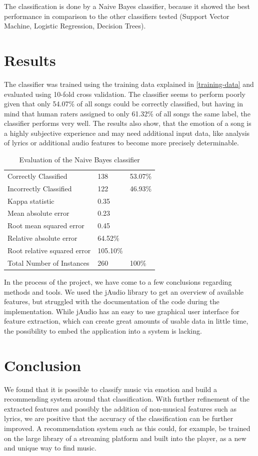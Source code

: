 \documentclass{sigchi-ext}
\begin{document}
The classification is done by a Naive Bayes classifier, because it showed the best performance in comparison to the other classifiers tested (Support Vector Machine, Logistic Regression, Decision Trees).

\section{Results}
The classifier was trained using the training data explained in \ref{training-data} and evaluated using 10-fold cross validation. The classifier seems to perform poorly given that only 54.07\% of all songs could be correctly classified, but having in mind that human raters assigned to only 61.32\% of all songs the same label, the classifier performs very well. The results also show, that the emotion of a song is a highly subjective experience and may need additional input data, like analysis of lyrics or additional audio features to become more precisely determinable.

\begin{table}
  \centering
  \begin{tabular}{@{}lll@{}}
    Correctly Classified          & 138       & 53.07\% \\
    Incorrectly Classified        & 122       & 46.93\% \\
    Kappa statistic 				      & 0.35      & \\
    Mean absolute error  			    & 0.23      & \\
    Root mean squared error 	    & 0.45      & \\
    Relative absolute error 	    & 64.52\%   & \\
    Root relative squared error   & 105.10\%  & \\
    Total Number of Instances     & 260       & 100\%
  \end{tabular}
  \caption{Evaluation of the Naive Bayes classifier}
\end{table}

In the process of the project, we have come to a few conclusions regarding methods and tools. We used the jAudio library to get an overview of available features, but struggled with the documentation of the code during the implementation. While jAudio has an easy to use graphical user interface for feature extraction, which can create great amounts of usable data in little time, the possibility to embed the application into a system is lacking.

\section{Conclusion}
We found that it is possible to classify music via emotion and build a recommending system around that classification. With further refinement of the extracted features and possibly the addition of non-musical features such as lyrics, we are positive that the accuracy of the classification can be further improved. A recommendation system such as this could, for example, be trained on the large library of a streaming platform and built into the player, as a new and unique way to find music.



\end{document}
